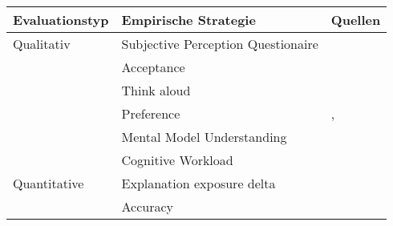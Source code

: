 \begin{table}[htb!]
    \begin{center}
        \begin{tabular}{|p{}|p{}|p{}|}
            \hline
            \textbf{Evaluationstyp} & \textbf{Empirische Strategie} & \textbf{Quellen} \\ \hline
            Qualitativ  & Subjective Perception Questionaire &  \cite{balog_measuring_2020} \cite{sato_context_nodate}
                                                                \cite{waa_evaluating_2021} \cite{eiband_impact_2019}  \cite{kouki_user_2017} \cite{tsai_evaluating_2019}
                                                                \cite{hernandez-bocanegra_effects_2020}
                                                                \cite{zahedi_towards_2019} \cite{tsai_effects_2020} 
                                                                \cite{ribera2019can} \\
                        & Acceptance                        & \cite{tintarev_designing_nodate}
                                                            \cite{hernandez-bocanegra_effects_2020}
                                                            \cite{kunkel_let_2019} \\
                        & Think aloud                       & \cite{wiegand_id_2020} \cite{yamada_evaluating_2016} \\
                        & Preference                        & \cite{kouki_user_2017} \cite{mucha_interfaces_2021} 
                                                            \cite{abdulrahman_belief-based_2019} 
                                                            \cite{waa_evaluating_2021} \cite{wiegand_id_2020} ,
                                                            \cite{stange_effects_2021} \cite{kaptein_personalised_2017} \\
                        & Mental Model Understanding        & \cite{gunning2019darpa} \\
                        & Cognitive Workload                & \cite{wiegand2019drive, wiegand_id_2020} \\
            \hline
            Quantitative& Explanation exposure delta & \\
                        & Accuracy                          & \cite{tintarev_designing_nodate}
                                                            \cite{waa_evaluating_2021} \cite{mucha_interfaces_2021}
                                                            \cite{kunkel_let_2019} \cite{zolotas_towards_2019} \\

\end{tabular}
\end{center}
\end{table}
